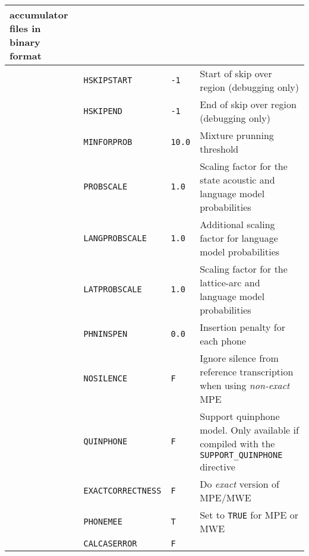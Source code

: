 \begin{center}
\begin{supertabular}{|p{1.8cm}|l|l|p{6.6cm}|}
  accumulator files in binary format \\ \hline







 & \texttt{HSKIPSTART} & \texttt{-1} & Start of skip over region (debugging only) \\ 


  & \texttt{HSKIPEND} & \texttt{-1} & End of skip over region (debugging only) \\ \hline










  & \texttt{MINFORPROB} & \texttt{10.0} & Mixture prunning threshold \\ 


  & \texttt{PROBSCALE} & \texttt{1.0} & Scaling factor for the state acoustic and language model probabilities \\ 


  & \texttt{LANGPROBSCALE} & \texttt{1.0} & Additional scaling factor for language model probabilities \\ 


  & \texttt{LATPROBSCALE} & \texttt{1.0} & Scaling factor for the lattice-arc and language model probabilities \\ 


  & \texttt{PHNINSPEN} & \texttt{0.0} & Insertion penalty for each phone \\ 


   & \texttt{NOSILENCE} & \texttt{F} & Ignore silence from reference transcription when using \emph{non-exact} MPE \\ 


  & \texttt{QUINPHONE} & \texttt{F} & Support quinphone model. Only available if compiled with the \texttt{SUPPORT\_QUINPHONE} directive \\ 


  & \texttt{EXACTCORRECTNESS} & \texttt{F} & Do \emph{exact} version of MPE/MWE \\ 


  & \texttt{PHONEMEE} & \texttt{T} & Set to \texttt{TRUE} for MPE or MWE \\ 


  & \texttt{CALCASERROR} & \texttt{F} &  \\ 



\end{supertabular}
\end{center}
